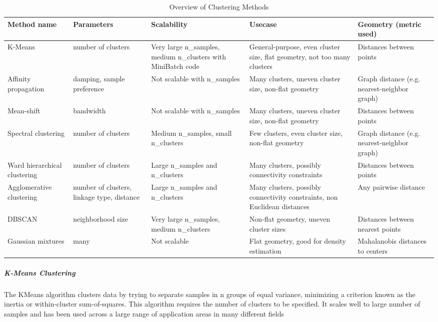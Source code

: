 \begin{table}[!htbp]
  \centering
  \caption{Overview of Clustering Methods}
  \label{tab:clustering}
  \begin{tabular}{| L{2.5cm} | L{2.5cm} | L{2.5cm} | L{3.5cm} | L{2.75cm} |} \hline
    {\bf Method name} & {\bf Parameters} & {\bf Scalability} & {\bf
Usecase} & {\bf Geometry (metric used)} \\ \hline
    K-Means  & number of clusters & Very large n\_samples, medium
n\_clusters with MiniBatch code & General-purpose, even cluster size,
flat geometry, not too many clusters & Distances between points
 \\ \hline
    Affinity propagation & damping, sample preference & Not scalable with
n\_samples & Many clusters, uneven cluster size, non-flat geometry &
Graph distance (e.g. nearest-neighbor graph)       \\ \hline
    Mean-shift & bandwidth & Not scalable with n\_samples & Many clusters,
 uneven cluster size, non-flat geometry & Distances between points \\ \hline
    Spectral clustering & number of clusters & Medium n\_samples, small
n\_clusters & Few clusters, even cluster size, non-flat geometry &
Graph distance (e.g. nearest-neighbor graph)       \\ \hline
    Ward hierarchical clustering & number of clusters & Large n\_samples
and n\_clusters & Many clusters, possibly connectivity constraints &
Distances between points       \\ \hline
    Agglomerative clustering & number of clusters, linkage type, distance
 & Large n\_samples and n\_clusters & Many clusters, possibly
connectivity constraints, non Euclidean distances & Any pairwise
distance       \\ \hline
    DBSCAN & neighborhood size & Very large n\_samples, medium n\_clusters
 & Non-flat geometry, uneven cluster sizes & Distances between nearest
 points       \\ \hline
    Gaussian mixtures & many & Not scalable & Flat geometry, good for
 density estimation & Mahalanobis distances to centers       \\ \hline
  \end{tabular}
\end{table}

\FloatBarrier

\subparagraph{K-Means Clustering} \hfill
\label{subparagraph:KMeans}

The KMeans algorithm clusters data by trying to separate samples in n groups
of equal variance, minimizing a criterion known as the inertia or within-cluster
sum-of-squares. This algorithm requires the number of clusters to be specified.
 It scales well to large number of samples and has been used across a large
range of application areas in many different fields

